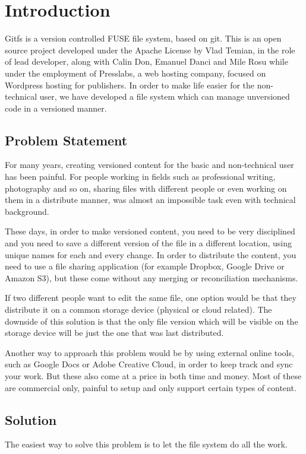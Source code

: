 
\chapter{Introduction}

Gitfs is a version controlled FUSE file system, based on git. This is an open source project developed under the Apache License by Vlad Temian, in the role of lead developer, along with Calin Don, Emanuel Danci and Mile Rosu while under the employment of Presslabs, a web hosting company, focused on Wordpress hosting for publishers. In order to make life easier for the non-technical user, we have developed a file system which can manage unversioned code in a versioned manner.

\section{Problem Statement}

For many years, creating versioned content for the basic and non-technical user has been painful. For people working in fields such as professional writing, photography and so on, sharing files with different people or even working on them in a distribute manner, was almost an impossible task even with technical background.

These days, in order to make versioned content, you need to be very disciplined and you need to save a different version of the file in a different location, using unique names for each and every change. In order to distribute the content, you need to use a file sharing application (for example Dropbox, Google Drive or Amazon S3), but these come without any merging or reconciliation mechanisms. 

If two different people want to edit the same file, one option would be that they distribute it on a common storage device (physical or cloud related). The downside of this solution is that the only file version which will be visible on the storage device will be just the one that was last distributed.

Another way to approach this problem would be by using external online tools, such as Google Docs or Adobe Creative Cloud, in order to keep track and sync your work. But these also come at a price in both time and money. Most of these are commercial only, painful to setup and only support certain types of content.

\section{Solution}
The easiest way to solve this problem is to let the file system do all the work.

